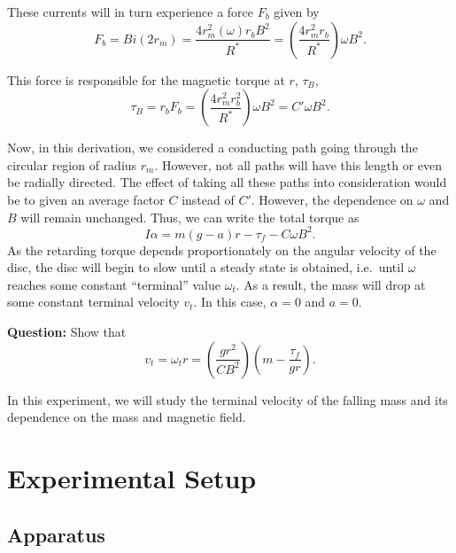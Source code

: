 These currents will in turn experience a force $F_b$ given by
\begin{equation}
    F_b = B i (2 r_m) = \frac{4 r_m^2 (\omega) r_b B^2}{R^*} = \left( \frac{4 r_m^2 r_b}{R^*}\right) \omega B^2.
\end{equation}

This force is responsible for the magnetic torque at $r$, $\tau_B$,
\begin{equation}
    \tau_B = r_b F_b = \left(\frac{4 r_m^2 r_b^2}{R^*} \right) \omega B^2 = C' \omega B^2.
\end{equation}

Now, in this derivation, we considered a conducting path going through the circular region of radius $r_m$. However, not all paths will have this length or even be radially directed. The effect of taking all these paths into consideration would be to given an average factor $C$ instead of $C'$. However, the dependence on $\omega$ and $B$ will remain unchanged. Thus, we can write the total torque as 
\begin{equation}
    I\alpha = m (g-a) r - \tau_f - C \omega B^2.
\end{equation}
As the retarding torque depends proportionately on the angular velocity of the disc, the disc will begin to slow until a steady state is obtained, i.e.\ until $\omega$ reaches some constant ``terminal'' value $\omega_t$. As a result, the mass will drop at some constant terminal velocity $v_t$. In this case, $\alpha=0$ and $a = 0$. 

\begin{question}
\textbf{Question:} Show that 
\begin{equation}
    v_t = \omega_t r = \left( \frac{g r^2}{CB^2}\right)\left( m - \frac{\tau_f}{g r}\right).
    \label{eqn:em-terminal}
\end{equation}
\end{question}

In this experiment, we will study the terminal velocity of the falling mass and its dependence on the mass and magnetic field.
 
\section*{Experimental Setup}


\subsection*{Apparatus}


